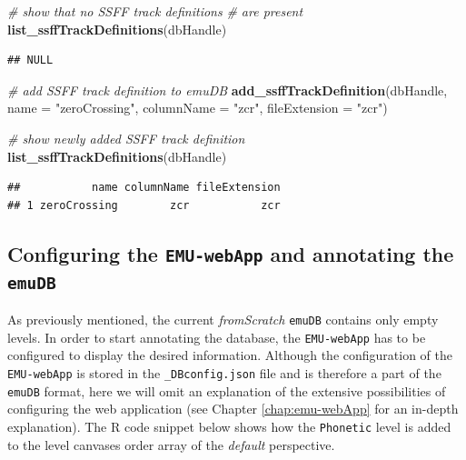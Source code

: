\documentclass[]{book}
\newenvironment{Shaded}{\begin{snugshade}}{\end{snugshade}}
\newcommand{\CommentTok}[1]{\textcolor[rgb]{0.56,0.35,0.01}{\textit{#1}}}
\newcommand{\DataTypeTok}[1]{\textcolor[rgb]{0.13,0.29,0.53}{#1}}
\newcommand{\KeywordTok}[1]{\textcolor[rgb]{0.13,0.29,0.53}{\textbf{#1}}}
\newcommand{\NormalTok}[1]{#1}
\newcommand{\StringTok}[1]{\textcolor[rgb]{0.31,0.60,0.02}{#1}}
\begin{document}
\begin{Shaded}
\begin{Highlighting}[]
\CommentTok{# show that no SSFF track definitions}
\CommentTok{# are present}
\KeywordTok{list_ssffTrackDefinitions}\NormalTok{(dbHandle)}
\end{Highlighting}
\end{Shaded}

\begin{verbatim}
## NULL
\end{verbatim}

\begin{Shaded}
\begin{Highlighting}[]
\CommentTok{# add SSFF track definition to emuDB}
\KeywordTok{add_ssffTrackDefinition}\NormalTok{(dbHandle,}
                        \DataTypeTok{name =} \StringTok{"zeroCrossing"}\NormalTok{,}
                        \DataTypeTok{columnName =} \StringTok{"zcr"}\NormalTok{,}
                        \DataTypeTok{fileExtension =} \StringTok{"zcr"}\NormalTok{)}

\CommentTok{# show newly added SSFF track definition}
\KeywordTok{list_ssffTrackDefinitions}\NormalTok{(dbHandle)}
\end{Highlighting}
\end{Shaded}

\begin{verbatim}
##           name columnName fileExtension
## 1 zeroCrossing        zcr           zcr
\end{verbatim}

\hypertarget{configuring-the-emu-webapp-and-annotating-the-emudb}{%
\subsection{\texorpdfstring{Configuring the \texttt{EMU-webApp} and annotating the \texttt{emuDB}}{Configuring the EMU-webApp and annotating the emuDB}}\label{configuring-the-emu-webapp-and-annotating-the-emudb}}

As previously mentioned, the current \emph{fromScratch} \texttt{emuDB} contains only empty levels. In order to start annotating the database, the \texttt{EMU-webApp} has to be configured to display the desired information. Although the configuration of the \texttt{EMU-webApp} is stored in the \texttt{\_DBconfig.json} file and is therefore a part of the \texttt{emuDB} format, here we will omit an explanation of the extensive possibilities of configuring the web application (see Chapter \ref{chap:emu-webApp} for an in-depth explanation). The R code snippet below shows how the \texttt{Phonetic} level is added to the level canvases order array of the \emph{default} perspective.
\end{document}
